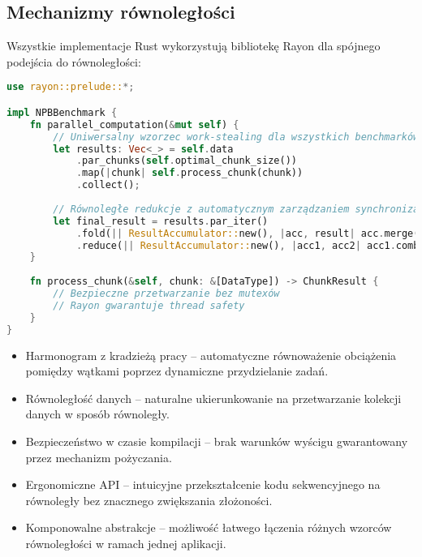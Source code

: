 \subsection{Mechanizmy równoległości}
Wszystkie implementacje Rust wykorzystują bibliotekę Rayon dla spójnego podejścia do równoległości:
\begin{lstlisting}[language=Rust, caption={Równoległość w benchmarkach NPB w języku Rust}, label={lst:rust_parallelism}]
use rayon::prelude::*;

impl NPBBenchmark {
    fn parallel_computation(&mut self) {
        // Uniwersalny wzorzec work-stealing dla wszystkich benchmarków
        let results: Vec<_> = self.data
            .par_chunks(self.optimal_chunk_size())
            .map(|chunk| self.process_chunk(chunk))
            .collect();
            
        // Równoległe redukcje z automatycznym zarządzaniem synchronizacją
        let final_result = results.par_iter()
            .fold(|| ResultAccumulator::new(), |acc, result| acc.merge(result))
            .reduce(|| ResultAccumulator::new(), |acc1, acc2| acc1.combine(acc2));
    }
    
    fn process_chunk(&self, chunk: &[DataType]) -> ChunkResult {
        // Bezpieczne przetwarzanie bez mutexów
        // Rayon gwarantuje thread safety
    }
}
\end{lstlisting}
\begin{itemize}
    \item Harmonogram z kradzieżą pracy  – automatyczne równoważenie obciążenia pomiędzy wątkami poprzez dynamiczne przydzielanie zadań.
    
    \item Równoległość danych – naturalne ukierunkowanie na przetwarzanie kolekcji danych w sposób równoległy.
    
    \item Bezpieczeństwo w czasie kompilacji – brak warunków wyścigu  gwarantowany przez mechanizm pożyczania.
    
    \item Ergonomiczne API – intuicyjne przekształcenie kodu sekwencyjnego na równoległy bez znacznego zwiększania złożoności.
    
    \item Komponowalne abstrakcje  – możliwość łatwego łączenia różnych wzorców równoległości w ramach jednej aplikacji.
  \end{itemize}
  

